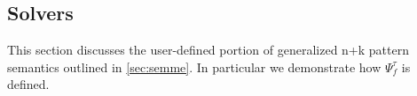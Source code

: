 \documentclass[preprint]{sigplanconf}
\begin{document}






\subsection{Solvers}
\label{sec:slv}

This section discusses the user-defined portion of generalized n+k pattern 
semantics outlined in \textsection\ref{sec:semme}. In particular we demonstrate 
how $\Psi_f^\tau$ is defined.
\end{document}
